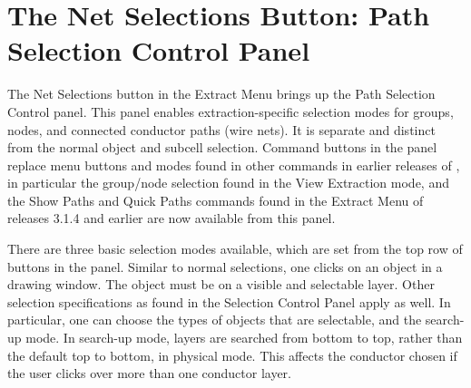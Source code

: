 \section{The {\cb Net Selections} Button: Path Selection Control Panel}
The {\cb Net Selections} button in the {\cb Extract Menu} brings up
the {\cb Path Selection Control} panel.  This panel enables
extraction-specific selection modes for groups, nodes, and connected
conductor paths (wire nets).  It is separate and distinct from the
normal object and subcell selection.  Command buttons in the panel
replace menu buttons and modes found in other commands in earlier
releases of {\Xic}, in particular the group/node selection found in
the {\cb View Extraction} mode, and the {\cb Show Paths} and {\cb
Quick Paths} commands found in the {\cb Extract Menu} of {\Xic}
releases 3.1.4 and earlier are now available from this panel.

There are three basic selection modes available, which are set from
the top row of buttons in the panel.  Similar to normal selections,
one clicks on an object in a drawing window.  The object must be on a
visible and selectable layer.  Other selection specifications as found
in the {\cb Selection Control Panel} apply as well.  In particular,
one can choose the types of objects that are selectable, and the
search-up mode.  In search-up mode, layers are searched from bottom to
top, rather than the default top to bottom, in physical mode.  This
affects the conductor chosen if the user clicks over more than one
conductor layer.

